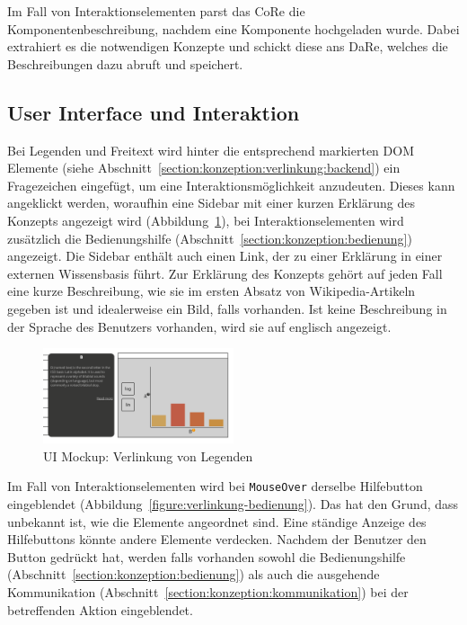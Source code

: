 \documentclass[
	headsepline,
	footsepline,
	fontsize=12pt,
	bibliography=totoc
]{scrbook}
\begin{document}
Im Fall von Interaktionselementen parst das CoRe die Komponentenbeschreibung, nachdem eine Komponente hochgeladen wurde. Dabei extrahiert es die notwendigen Konzepte und schickt diese ans DaRe, welches die Beschreibungen dazu abruft und speichert.

\subsection{User Interface und Interaktion}

Bei Legenden und Freitext wird hinter die entsprechend markierten DOM Elemente (siehe Abschnitt~\ref{section:konzeption:verlinkung:backend}) ein Fragezeichen eingefügt, um eine Interaktionsmöglichkeit anzudeuten. Dieses kann angeklickt werden, woraufhin eine Sidebar mit einer kurzen Erklärung des Konzepts angezeigt wird (Abbildung~\ref{figure:verlinkung}), bei Interaktionselementen wird zusätzlich die Bedienungshilfe (Abschnitt~\ref{section:konzeption:bedienung}) angezeigt. Die Sidebar enthält auch einen Link, der zu einer Erklärung in einer externen Wissensbasis führt. Zur Erklärung des Konzepts gehört auf jeden Fall eine kurze Beschreibung, wie sie im ersten Absatz von Wikipedia-Artikeln gegeben ist und idealerweise ein Bild, falls vorhanden. Ist keine Beschreibung in der Sprache des Benutzers vorhanden, wird sie auf englisch angezeigt.

\begin{figure}[htbp]
   \centering
   \includegraphics[width=0.5\textwidth]{images/konzeption-verlinkung.png}
   \caption{UI Mockup: Verlinkung von Legenden}
   \label{figure:verlinkung}
\end{figure}

Im Fall von Interaktionselementen wird bei \texttt{MouseOver} derselbe Hilfebutton eingeblendet (Abbildung~\ref{figure:verlinkung-bedienung}). Das hat den Grund, dass unbekannt ist, wie die Elemente angeordnet sind. Eine ständige Anzeige des Hilfebuttons könnte andere Elemente verdecken. Nachdem der Benutzer den Button gedrückt hat, werden falls vorhanden sowohl die Bedienungshilfe (Abschnitt~\ref{section:konzeption:bedienung}) als auch die ausgehende Kommunikation (Abschnitt~\ref{section:konzeption:kommunikation}) bei der betreffenden Aktion eingeblendet.
\end{document}
